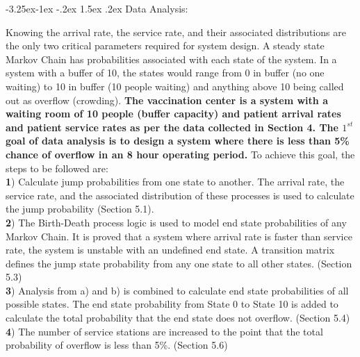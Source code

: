 \documentclass[11pt]{article}
\makeatletter
\renewcommand\subsection{\@startsection{subsection}{2}{\z@}%
                                         {-3.25ex\@plus -1ex \@minus -.2ex}%
                                         {1.5ex \@plus .2ex}%
                                         {\normalfont\fontfamily{phv}\fontsize{14}{17}\bfseries}}
\makeatother
\begin{document}
 
 \subsection{Data Analysis:}
 
Knowing the arrival rate, the service rate, and their associated distributions are the only two critical parameters required for system design. A steady state Markov Chain has probabilities associated with each state of the system. In a system with a buffer of 10, the states would range from 0 in buffer (no one waiting) to 10 in buffer (10 people waiting) and anything above 10 being called out as overflow (crowding). \textbf{The vaccination center is a system with a waiting room of 10 people (buffer capacity) and patient arrival rates and patient service rates as per the data collected in Section 4. The $1^{st}$ goal of data analysis is to design a system where there is less than 5\% chance of overflow in an 8 hour operating period.} To achieve this goal, the steps to be followed are:\\
\linebreak
\textbf{1}) \hspace{1mm} Calculate jump probabilities from one state to another. The arrival rate, the service rate, and the associated distribution of these processes is used to calculate the jump probability (Section 5.1).\\
\linebreak
\textbf{2}) \hspace{1mm} The Birth-Death process logic is used to model end state probabilities of any Markov Chain. It is proved that a system where arrival rate is faster than service rate, the system is unstable with an undefined end state. A transition matrix defines the jump state probability from any one state to all other states. (Section 5.3)\\
\linebreak
\textbf{3}) \hspace{1mm} Analysis from a) and b) is combined to calculate end state probabilities of all possible states. The end state probability from State 0 to State 10 is added to calculate the total probability that the end state does not overflow. (Section 5.4)\\
\linebreak
\textbf{4}) \hspace{1mm} The number of service stations are increased to the point that the total probability of overflow is less than 5\%. (Section 5.6)
\end{document}
